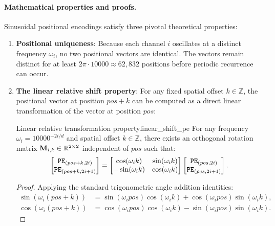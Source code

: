 \documentclass[../../main.tex]{subfiles}
\begin{document}
\paragraph{Mathematical properties and proofs.}
Sinusoidal positional encodings satisfy three pivotal theoretical properties:
\begin{enumerate}
    \item \textbf{Positional uniqueness}: Because each channel $i$ oscillates at a distinct frequency $\omega_i$, no two positional vectors are identical. The vectors remain distinct for at least $2\pi \cdot 10000 \approx 62{,}832$ positions before periodic recurrence can occur.
    \item \textbf{The linear relative shift property}: For any fixed spatial offset $k \in \mathbb{Z}$, the positional vector at position $pos + k$ can be computed as a direct linear transformation of the vector at position $pos$:
    \begin{theorem}{Linear relative transformation property}{linear_shift_pe}
    For any frequency $\omega_i = 10000^{-2i/d}$ and spatial offset $k \in \mathbb{Z}$, there exists an orthogonal rotation matrix $\mathbf{M}_{i, k} \in \mathbb{R}^{2 \times 2}$ independent of $pos$ such that:
    \begin{equation}
    \label{eq:linear_pe_rotation}
    \begin{bmatrix} \text{\texttt{PE}}_{(pos+k, 2i)} \\ \text{\texttt{PE}}_{(pos+k, 2i+1)} \end{bmatrix} = \begin{bmatrix} \cos(\omega_i k) & \sin(\omega_i k) \\ -\sin(\omega_i k) & \cos(\omega_i k) \end{bmatrix} \begin{bmatrix} \text{\texttt{PE}}_{(pos, 2i)} \\ \text{\texttt{PE}}_{(pos, 2i+1)} \end{bmatrix}.
    \end{equation}
    \end{theorem}
    \begin{proof}
    Applying the standard trigonometric angle addition identities:
    \begin{align}
    \sin(\omega_i(pos + k)) &= \sin(\omega_i pos)\cos(\omega_i k) + \cos(\omega_i pos)\sin(\omega_i k), \\
    \cos(\omega_i(pos + k)) &= \cos(\omega_i pos)\cos(\omega_i k) - \sin(\omega_i pos)\sin(\omega_i k).
    \end{align}

\end{proof}
\end{enumerate}
\end{document}
